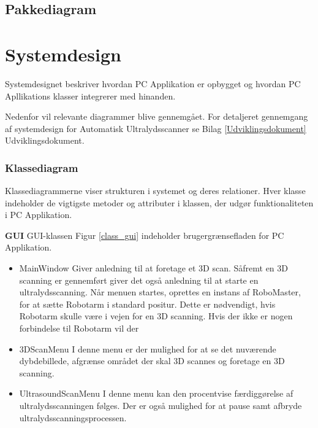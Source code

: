 \subsection{Pakkediagram} 









\section{Systemdesign} \label{Systemdesign}
Systemdesignet beskriver hvordan PC Applikation er opbygget og hvordan PC Apllikations klasser integrerer med hinanden.  

Nedenfor vil relevante diagrammer blive gennemgået. For detaljeret gennemgang af systemdesign for Automatisk Ultralydsscanner se Bilag  \ref{Udviklingsdokument} Udviklingsdokument.

\subsubsection{Klassediagram}
Klassediagrammerne viser strukturen i systemet og deres relationer. Hver klasse indeholder de vigtigste metoder og attributer i klassen, der udgør funktionaliteten i PC Applikation. 

\textbf{GUI}
GUI-klassen Figur \ref{class_gui} indeholder brugergrænsefladen for PC Applikation.

\let\labelitemi\labelitemii
\begin{itemize}
\item{MainWindow}\newline
Giver anledning til at foretage et 3D scan. Såfremt en 3D scanning er gennemført giver det også anledning til at starte en ultralydsscanning.
Når menuen startes, oprettes en instans af RoboMaster, for at sætte Robotarm i standard positur. Dette er nødvendigt, hvis Robotarm skulle være i vejen for en 3D scanning.
Hvis der ikke er nogen forbindelse til Robotarm vil der 

\item{3DScanMenu}\newline
I denne menu er der mulighed for at se det nuværende dybdebillede, afgrænse området der skal 3D scannes og foretage en 3D scanning.

\item{UltrasoundScanMenu}\newline
I denne menu kan den procentvise færdiggørelse af ultralydsscanningen følges. Der er også mulighed for at pause samt afbryde ultralydsscanningsprocessen.
\end{itemize}

